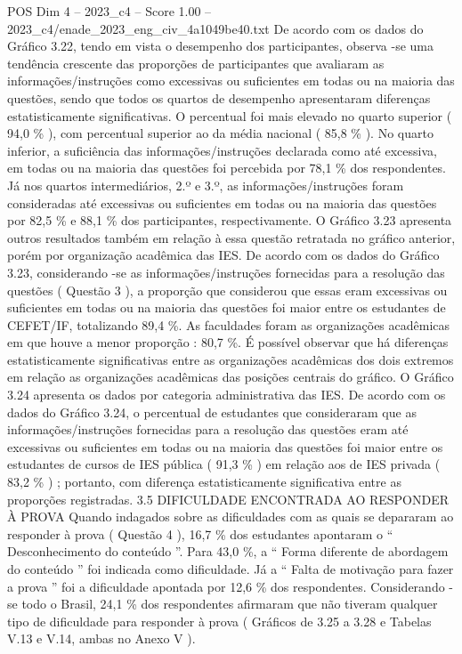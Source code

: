 \begin{textsample}{POS Dim 4 – 2023\_c4 – Score 1.00 – 2023\_c4/enade\_2023\_eng\_civ\_4a1049be40.txt}
De acordo com os dados do Gráfico 3.22, tendo em vista o desempenho dos participantes, observa -se uma tendência crescente das proporções de participantes que avaliaram as informações/instruções como excessivas ou suficientes em todas ou na maioria das questões, sendo que todos os quartos de desempenho apresentaram diferenças estatisticamente significativas.
O percentual foi mais elevado no quarto superior ( 94,0 \% ), com percentual superior ao da média nacional ( 85,8 \% ).
No quarto inferior, a suficiência das informações/instruções declarada como até excessiva, em todas ou na maioria das questões foi percebida por 78,1 \% dos respondentes.
Já nos quartos intermediários, 2.º e 3.º, as informações/instruções foram consideradas até excessivas ou suficientes em todas ou na maioria das questões por 82,5 \% e 88,1 \% dos participantes, respectivamente.
O Gráfico 3.23 apresenta outros resultados também em relação à essa questão retratada no gráfico anterior, porém por organização acadêmica das IES.
De acordo com os dados do Gráfico 3.23, considerando -se as informações/instruções fornecidas para a resolução das questões ( Questão 3 ), a proporção que considerou que essas eram excessivas ou suficientes em todas ou na maioria das questões foi maior entre os estudantes de CEFET/IF, totalizando 89,4 \%.
As faculdades foram as organizações acadêmicas em que houve a menor proporção : 80,7 \%.
É possível observar que há diferenças estatisticamente significativas entre as organizações acadêmicas dos dois extremos em relação as organizações acadêmicas das posições centrais do gráfico.
O Gráfico 3.24 apresenta os dados por categoria administrativa das IES.
De acordo com os dados do Gráfico 3.24, o percentual de estudantes que consideraram que as informações/instruções fornecidas para a resolução das questões eram até excessivas ou suficientes em todas ou na maioria das questões foi maior entre os estudantes de cursos de IES pública ( 91,3 \% ) em relação aos de IES privada ( 83,2 \% ) ; portanto, com diferença estatisticamente significativa entre as proporções registradas. 3.5 DIFICULDADE ENCONTRADA AO RESPONDER À PROVA Quando indagados sobre as dificuldades com as quais se depararam ao responder à prova ( Questão 4 ), 16,7 \% dos estudantes apontaram o “ Desconhecimento do conteúdo ”.
Para 43,0 \%, a “ Forma diferente de abordagem do conteúdo ” foi indicada como dificuldade.
Já a “ Falta de motivação para fazer a prova ” foi a dificuldade apontada por 12,6 \% dos respondentes.
Considerando -se todo o Brasil, 24,1 \% dos respondentes afirmaram que não tiveram qualquer tipo de dificuldade para responder à prova ( Gráficos de 3.25 a 3.28 e Tabelas V.13 e V.14, ambas no Anexo V ).

\end{textsample}
